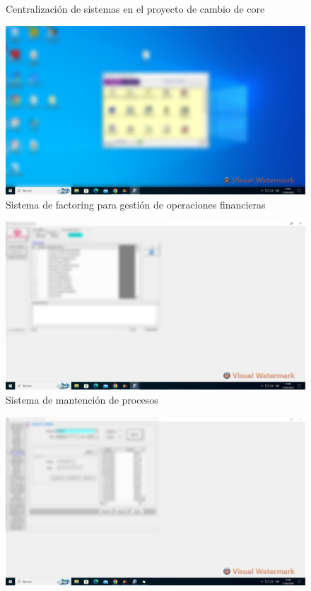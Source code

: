\documentclass[12pt,a4paper]{report}
\begin{document}
\begin{itemize}
\begin{figure}[H]
      \caption{Centralización de sistemas en el proyecto de cambio de core}
    \end{figure}
    \begin{figure}[H]
      \centering
      \includegraphics[width=14cm]{images/pantallas/sistema-factoring.png}
      \caption{Sistema de factoring para gestión de operaciones financieras}
    \end{figure}
    \begin{figure}[H]
      \centering
      \includegraphics[width=14cm]{images/pantallas/mantencion-procesos.png}
      \caption{Sistema de mantención de procesos}
    \end{figure}
    \begin{figure}[H]
      \centering
      \includegraphics[width=14cm]{images/pantallas/mantencion-dolar.png}

\end{figure}
\end{itemize}
\end{document}
